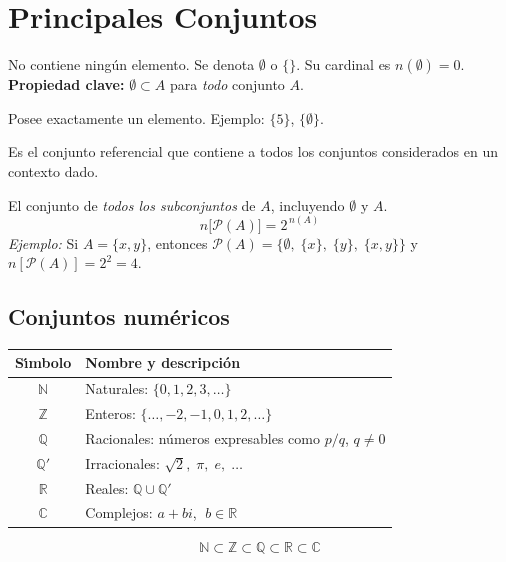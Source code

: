 \section{Principales Conjuntos}

\begin{cajaprop}
  No contiene ning\'un elemento. Se denota $\emptyset$ o $\{\}$.
  Su cardinal es $n(\emptyset) = 0$.\\
  \textbf{Propiedad clave:} $\emptyset \subset A$ para \emph{todo} conjunto $A$.
\end{cajaprop}

\begin{cajaprop}
  Posee exactamente un elemento. Ejemplo: $\{5\}$, $\{\emptyset\}$.
\end{cajaprop}

\begin{cajaprop}
  Es el conjunto referencial que contiene a todos los conjuntos considerados
  en un contexto dado.
\end{cajaprop}

\begin{cajaprop}
  El conjunto de \emph{todos los subconjuntos} de $A$, incluyendo $\emptyset$ y $A$.
  \[
    n\bigl[\mathcal{P}(A)\bigr] = 2^{\,n(A)}
  \]
  \textit{Ejemplo:} Si $A = \{x, y\}$, entonces
  $\mathcal{P}(A) = \{\emptyset,\; \{x\},\; \{y\},\; \{x,y\}\}$
  y $n[\mathcal{P}(A)] = 2^{2} = 4$.
\end{cajaprop}

\subsection{Conjuntos num\'ericos}

\begin{cajaformula}
  \begin{center}
  \renewcommand{\arraystretch}{1.5}
  \begin{tabular}{@{}cl@{}}
    \toprule
    \rowcolor{AzulClaro!60}
    \textbf{S\'{\i}mbolo} & \textbf{Nombre y descripci\'on} \\
    \midrule
    $\mathbb{N}$ & Naturales: $\{0, 1, 2, 3, \ldots\}$ \\
    $\mathbb{Z}$ & Enteros: $\{\ldots, -2, -1, 0, 1, 2, \ldots\}$ \\
    $\mathbb{Q}$ & Racionales: n\'umeros expresables como $p/q$, $q \neq 0$ \\
    $\mathbb{Q}'$& Irracionales: $\sqrt{2},\; \pi,\; e,\; \ldots$ \\
    $\mathbb{R}$ & Reales: $\mathbb{Q} \cup \mathbb{Q}'$ \\
    $\mathbb{C}$ & Complejos: $a + bi$, $\; b \in \mathbb{R}$ \\
    \bottomrule
  \end{tabular}
  \end{center}
  \[
    \mathbb{N} \subset \mathbb{Z} \subset \mathbb{Q} \subset \mathbb{R}
    \subset \mathbb{C}
  \]
\end{cajaformula}

